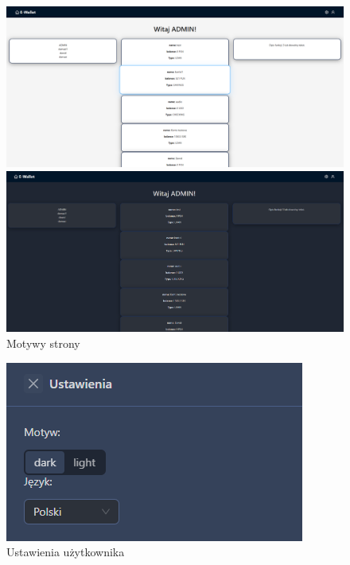 \begin{figure}[H]
    \begin{minipage}{0.5\textwidth}
	\centering
	\includegraphics[width=\linewidth]{images/MotywJasny}
\end{minipage}
\hfill
\begin{minipage}{0.5\textwidth}
	\centering
	\includegraphics[width=\linewidth]{images/MotywCiemny}
\end{minipage}
	\caption[]{Motywy strony}
	\label{fig:motywy}
\end{figure}

\begin{figure}[H]
	\centering
	\includegraphics[width=0.7\linewidth]{images/Ustawienia}
	\caption{Ustawienia użytkownika}
	\label{fig:ustawienia}
\end{figure}
